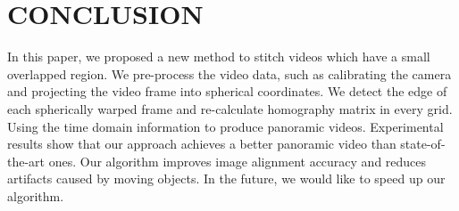 \documentclass[conference]{IEEEtran}
\begin{document}
\section{CONCLUSION}
\label{sec:conclusion}

In this paper, we proposed a new method to stitch videos which have a small overlapped region. We pre-process the video data, such as calibrating the camera and projecting the video frame into spherical
coordinates. We detect the edge of each spherically warped frame and re-calculate homography matrix in every grid. Using the time domain information to produce panoramic videos. 
Experimental results show that our approach achieves a better panoramic video than state-of-the-art ones. Our algorithm improves image alignment accuracy and reduces artifacts caused by
moving objects. In the future, we would like to speed up our algorithm.
\end{document}
